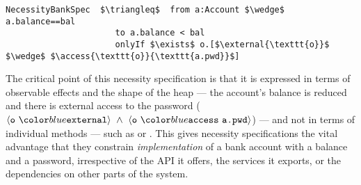 %
%
%
%
%
%
\begin{lstlisting}[language = Chainmail, mathescape=true, frame=lines]
NecessityBankSpec  $\triangleq$  from a:Account $\wedge$ a.balance==bal
                      to a.balance < bal
                      onlyIf $\exists$ o.[$\external{\texttt{o}}$ $\wedge$ $\access{\texttt{o}}{\texttt{a.pwd}}$]
\end{lstlisting}
%
%
% 
The critical point of this necessity specification is that it is
expressed in terms of observable effects and the shape of the heap --- the account's balance is reduced 
and there is external access to the password ($\external{\prg{o}}\ \wedge\ \access{\prg{o}}{\prg{a.pwd}}$)
--- and not in terms of individual methods --- such as
 or .
This gives necessity specifications the
vital advantage that they constrain
\textit{implementation} of a bank account with a balance and a
password, irrespective of the API it
offers, the services it exports, or the dependencies on other parts of
the system.
   


